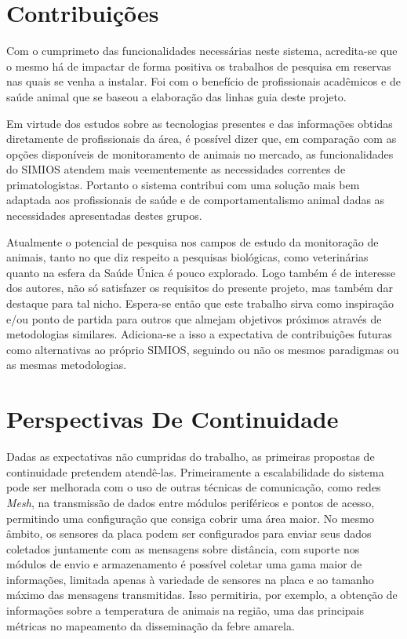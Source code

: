 \section{Contribuições}

Com o cumprimeto das funcionalidades necessárias neste sistema, acredita-se que o mesmo há de impactar de forma positiva os trabalhos de pesquisa em reservas nas quais se venha a instalar. Foi com o benefício de profissionais acadêmicos e de saúde animal que se baseou a elaboração das linhas guia deste projeto.

Em virtude dos estudos sobre as tecnologias presentes e das informações obtidas diretamente de profissionais da área, é possível dizer que, em comparação com as opções disponíveis de monitoramento de animais no mercado, as funcionalidades do SIMIOS atendem mais veementemente as necessidades correntes de primatologistas. Portanto o sistema contribui com uma solução mais bem adaptada aos profissionais de saúde e de comportamentalismo animal dadas as necessidades apresentadas destes grupos.

Atualmente o potencial de pesquisa nos campos de estudo da monitoração de animais, tanto no que diz respeito a pesquisas biológicas, como veterinárias quanto na esfera da Saúde Única é pouco explorado. Logo também é de interesse dos autores, não só satisfazer os requisitos do presente projeto, mas também dar destaque para tal nicho. Espera-se então que este trabalho sirva como inspiração e/ou ponto de partida para outros que almejam objetivos próximos através de metodologias similares. Adiciona-se a isso a expectativa de contribuições futuras como alternativas ao próprio SIMIOS, seguindo ou não os mesmos paradigmas ou as mesmas metodologias.

\section{Perspectivas De Continuidade}

Dadas as expectativas não cumpridas do trabalho, as primeiras propostas de continuidade pretendem atendê-las. Primeiramente a escalabilidade do sistema pode ser melhorada com o uso de outras técnicas de comunicação, como redes \emph{Mesh}, na transmissão de dados entre módulos periféricos e pontos de acesso, permitindo uma configuração que consiga cobrir uma área maior. No mesmo âmbito, os sensores da placa podem ser configurados para enviar seus dados coletados juntamente com as mensagens sobre distância, com suporte nos módulos de envio e armazenamento é possível coletar uma gama maior de informações, limitada apenas à variedade de sensores na placa e ao tamanho máximo das mensagens transmitidas. Isso permitiria, por exemplo, a obtenção de informações sobre a temperatura de animais na região, uma das principais métricas no mapeamento da disseminação da febre amarela.

